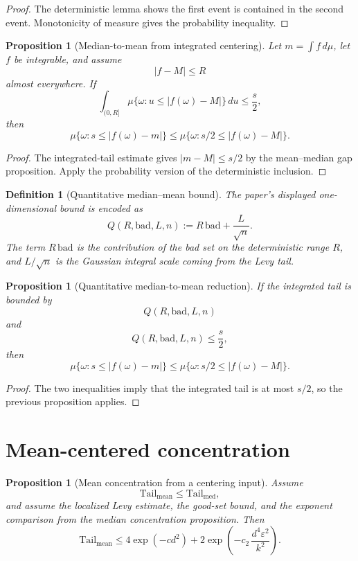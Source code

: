 \documentclass[11pt]{article}
\newtheorem{proposition}[theorem]{Proposition}
\newtheorem{definition}[theorem]{Definition}
\begin{document}
\begin{proof}
The deterministic lemma shows the first event is contained in the second
event.  Monotonicity of measure gives the probability inequality.
\end{proof}

\begin{proposition}[Median-to-mean from integrated centering]
Let \(m=\int f\,d\mu\), let \(f\) be integrable, and assume
\[
  |f-M|\le R
\]
almost everywhere.  If
\[
 \int_{(0,R]}
   \mu\{\omega:u\le |f(\omega)-M|\}\,du
 \le \frac{s}{2},
\]
then
\[
 \mu\{\omega:s\le |f(\omega)-m|\}
 \le
 \mu\{\omega:s/2\le |f(\omega)-M|\}.
\]
\end{proposition}

\begin{proof}
The integrated-tail estimate gives \(|m-M|\le s/2\) by the mean--median gap
proposition.  Apply the probability version of the deterministic inclusion.
\end{proof}

\begin{definition}[Quantitative median--mean bound]
The paper's displayed one-dimensional bound is encoded as
\[
  Q(R,\mathrm{bad},L,n)
  :=
  R\,\mathrm{bad}
  +\frac{L}{\sqrt n}.
\]
The term \(R\,\mathrm{bad}\) is the contribution of the bad set on the
deterministic range \(R\), and \(L/\sqrt n\) is the Gaussian integral scale
coming from the Levy tail.
\end{definition}

\begin{proposition}[Quantitative median-to-mean reduction]
If the integrated tail is bounded by
\[
 Q(R,\mathrm{bad},L,n)
\]
and
\[
 Q(R,\mathrm{bad},L,n)\le \frac{s}{2},
\]
then
\[
 \mu\{\omega:s\le |f(\omega)-m|\}
 \le
 \mu\{\omega:s/2\le |f(\omega)-M|\}.
\]
\end{proposition}

\begin{proof}
The two inequalities imply that the integrated tail is at most \(s/2\), so the
previous proposition applies.
\end{proof}

\section{Mean-centered concentration}

\begin{proposition}[Mean concentration from a centering input]
Assume
\[
 \mathrm{Tail}_{\mathrm{mean}}
 \le
 \mathrm{Tail}_{\mathrm{med}},
\]
and assume the localized Levy estimate, the good-set bound, and the exponent
comparison from the median concentration proposition.  Then
\[
 \mathrm{Tail}_{\mathrm{mean}}
 \le
 4\exp(-c d^2)
 +2\exp\!\left(-c_2\,\frac{d^4\varepsilon^2}{k^2}\right).
\]
\end{proposition}
\end{document}
